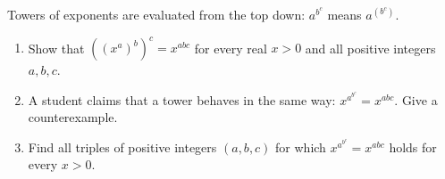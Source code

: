Towers of exponents are evaluated from the top down: $a^{b^c}$ means $a^{\left(b^c\right)}$.
\begin{enumerate}
\item[(a)] Show that $\left(\left(x^a\right)^b\right)^c=x^{abc}$ for every real $x>0$ and all positive integers $a,b,c$.
\item[(b)] A student claims that a tower behaves in the same way: $x^{a^{b^c}}=x^{abc}$. Give a counterexample.
\item[(c)] Find all triples of positive integers $(a,b,c)$ for which $x^{a^{b^c}}=x^{abc}$ holds for every $x>0$.
\end{enumerate}
